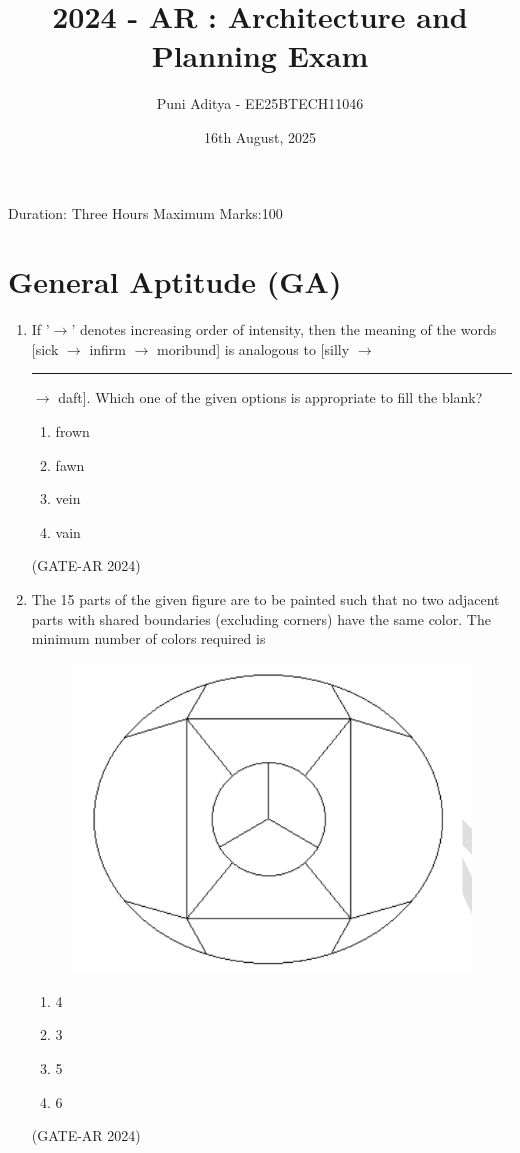 \documentclass[a4paper,10pt]{article}
\begin{document}
\title{2024 - AR : Architecture and Planning Exam}
\author{Puni Aditya - EE25BTECH11046}
\date{16th August, 2025}
\maketitle
Duration: Three Hours \hfill Maximum Marks:100

\section*{General Aptitude (GA)}

\begin{enumerate}
    \item If '$\to$' denotes increasing order of intensity, then the meaning of the words [sick $\to$ infirm $\to$ moribund] is analogous to [silly $\to$ \rule{2cm}{0.4pt} $\to$ daft]. Which one of the given options is appropriate to fill the blank?
    \begin{multicols}{4}
    \begin{enumerate}
        \item frown
        \item fawn
        \item vein
        \item vain
    \end{enumerate}
    \end{multicols}
    \hfill (GATE-AR 2024)

    \item The 15 parts of the given figure are to be painted such that no two adjacent parts with shared boundaries (excluding corners) have the same color. The minimum number of colors required is
    \begin{figure}[h!]
    \centering
    \includegraphics[width=0.5\columnwidth]{figs/01.jpg}
    \caption{}
    \label{fig:Img01}
    \end{figure}
    \begin{multicols}{4}
    \begin{enumerate}
        \item 4
        \item 3
        \item 5
        \item 6
    \end{enumerate}
    \end{multicols}
    \hfill (GATE-AR 2024)


\end{enumerate}
\end{document}
